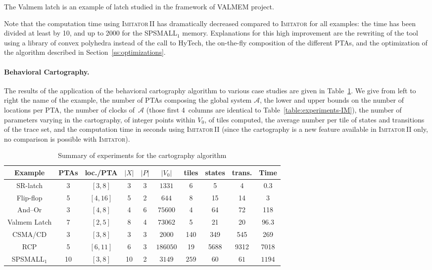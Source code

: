 \documentclass[submission,copyright,creativecommons]{eptcs}
\newcommand{\A}{\mathcal{A}}
\newcommand{\hytech}{{\sc HyTech}}
\newcommand{\imitator}{\textsc{Imitator}}
\newcommand{\imitatordeux}{\textsc{Imitator}\,II}
\newcommand{\paragraphe}[1]{\paragraph{#1.}}
\begin{document}
The Valmem latch is an example of latch studied in the framework of VALMEM project.

Note that the computation time using \imitatordeux{} has dramatically decreased compared to \imitator{} for all examples: the time has been divided at least by 10, and up to 2000 for the SPSMALL$_1$ memory.
Explanations for this high improvement are the rewriting of the tool using a library of convex polyhedra instead of the call to \hytech{}, the on-the-fly composition of the different PTAs, and the optimization of the algorithm described in Section~\ref{ss:optimizations}.



\paragraphe{Behavioral Cartography}
The results of the application of the behavioral cartography algorithm to various case studies are given in Table~\ref{table:experiments-BC}.
We give from left to right the name of the example,
the number of PTAs composing the global system $\A$,
the lower and upper bounds on the number of locations per PTA,
the number of clocks of~$\A$ (those first 4~columns are identical to Table~\ref{table:experiments-IM}),
the number of parameters varying in the cartography,
of integer points within $V_0$,
of tiles computed,
the average number per tile of states and transitions of the trace set,
and the computation time in seconds using \imitatordeux{} (since the cartography is a new feature available in \imitatordeux{} only, no comparison is possible with \imitator{}).


\begin{table}[ht!]

\centering

\small

\begin{tabular}{|@{\,}c@{\,}||@{\,}c@{\,}|@{\,}c@{\,}|@{\,}c@{\,}|@{\,}c@{\,}|@{\,}c@{\,}||@{\,}c@{\,}|@{\,}c@{\,} | @{\,}c@{\,} ||@{\,}c@{\,}|}
 \hline
   Example & PTAs & loc./PTA & $|X|$  & $|P|$ & $|V_0|$ & tiles & states & trans. & Time \\
 \hline
   SR-latch & 3 & $[3, 8]$ & 3 & 3 & $1331$ & 6 & 5 & 4 & $0.3$ \\
 \hline
   Flip-flop \cite{cc07} & 5 & $[4, 16]$ & 5 & 2 & $644$ & 8 & 15 & 14 & 3 \\
 \hline
   And--Or \cite{cc05} & 3 & $[4, 8]$ & 4 & 6 & $75600$ & 4 & 64 & 72 & 118 \\
 \hline
   Valmem Latch & 7 & $[2, 5]$ & 8 & 4 & $73062$ & 5 & 21 & 20 & $96.3$ \\
 \hline
CSMA/CD \cite{knsw07} & 3 & $[3, 8]$ & 3 & 3 & $2000$ & 140 & 349 & 545 & 269 \\
 \hline
   RCP \cite{kns03} & 5 & $[6, 11]$ & 6 & 3 & $186050$ & 19 & 5688 & 9312 & 7018 \\
 \hline
   SPSMALL$_1$ \cite{cefx09} & 10 & $[3, 8]$ & 10 & 2 & $3149$ & $259$ & $60$ & $61$ & $1194$ \\
\hline
\end{tabular}

\caption{Summary of experiments for the cartography algorithm}
\label{table:experiments-BC}
\end{table}
\end{document}
